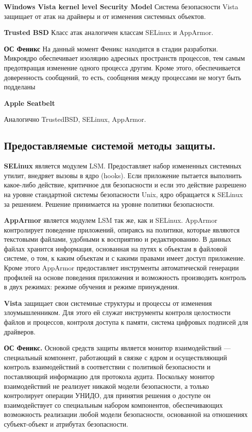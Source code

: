 \bigskip
{\bfseries Windows Vista kernel level Security Model }
Система безопасности Vista защищает от атак на 
драйверы и от изменения системных объектов. 

\bigskip
{\bfseries Trusted BSD} 
Класс атак аналогичен классам SELinux и AppArmor. 

\bigskip
{\bfseries ОС Феникс }
На данный момент Феникс находится в стадии разработки. 
Микроядро обеспечивает изоляцию адресных пространств 
процессов, тем самым предотвращая изменение одного 
процесса другим. Кроме этого, обеспечивается доверенность 
сообщений, то есть, сообщения между процессами не могут 
быть подделаны 

\bigskip
{\bfseries Apple Seatbelt}

Аналогично TrustedBSD, SELinux, AppArmor.

\bigskip
\subsection{Предоставляемые системой методы защиты.}

\bigskip
{\bfseries SELinux} является модулем LSM. 
Предоставляет набор измененных системных утилит, 
внедряет вызовы в ядро (hooks). Если приложение 
пытается выполнить какое-либо действие, критичное 
для безопасности и если это действие разрешено на 
уровне стандартной системы безопасности Unix, 
ядро обращается к SELinux за решением. Решение 
принимается на уровне политики безопасности. 

\bigskip
{\bfseries AppArmor} является модулем LSM так же, 
как и SELinux. AppArmor контролирует поведение 
приложений, опираясь на политики, которые являются 
текстовыми файлами, удобными к восприятию и редактированию. 
В данных файлах хранится информация, основанная на 
путях к объектам в файловой системе, о том, к каким 
объектам и с какими правами имеет доступ приложение. 
Кроме этого AppArmor предоставляет инструменты 
автоматической генерации профилей на основе поведения 
приложения и возможность производить контроль в двух 
режимах: режиме обучения и режиме принуждения. 

\bigskip
{\bfseries Vista} защищает свои системные структуры 
и процессы от изменения злоумышленником. Для этого 
ей служат инструменты контроля целостности файлов 
и процессов, контроля доступа к памяти, система 
цифровых подписей для драйверов. 

\bigskip
{\bfseries ОС Феникс.} Основой средств защиты является 
монитор взаимодействий — специальный компонент, 
работающий в связке с ядром и осуществляющий контроль 
взаимодействий в соответствии с политикой безопасности 
и поставляющий информацию для протокола аудита. Поскольку 
монитор взаимодействий не реализует никакой модели 
безопасности, а только контролирует операции УНИДО, 
для принятия решения о доступе он взаимодействует со 
специальным набором компонентов, обеспечивающих возможность 
реализации любой модели безопасности, основанной на 
отношениях субъект-объект и атрибутах безопасности. 

